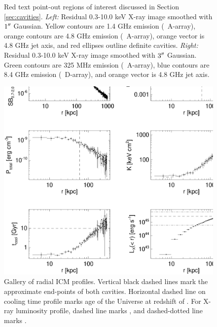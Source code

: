 \begin{figure}
\begin{center}
\begin{minipage}{0.495\linewidth}
    \end{minipage}
    \caption{Red text point-out regions of interest discussed in
      Section \ref{sec:cavities}. {\it{Left:}} Residual 0.3-10.0 keV
      X-ray image smoothed with $1\rm{^\prime}\hskip -0.1em\rm{^\prime}$ Gaussian. Yellow contours are
      1.4 GHz emission (\vla\ A-array), orange contours are 4.8 GHz
      emission (\vla\ A-array), orange vector is 4.8 GHz jet axis, and
      red ellipses outline definite cavities. {\it{Right:}} Residual
      0.3-10.0 keV X-ray image smoothed with $3\rm{^\prime}\hskip -0.1em\rm{^\prime}$ Gaussian. Green
      contours are 325 MHz emission (\vla\ A-array), blue contours are
      8.4 GHz emission (\vla\ D-array), and orange vector is 4.8 GHz
      jet axis.}
    \label{fig:subxray}
  \end{center}
\end{figure}

\begin{figure}
  \begin{center}
    \begin{minipage}{\linewidth}
      \includegraphics*[width=\textwidth]{r797_nhfro.eps}
      \caption{Gallery of radial ICM profiles. Vertical black dashed
        lines mark the approximate end-points of both
        cavities. Horizontal dashed line on cooling time profile marks
        age of the Universe at redshift of \rbs. For X-ray luminosity
        profile, dashed line marks \lcool, and dashed-dotted line
        marks \pcav.}
      \label{fig:gallery}
    \end{minipage}
  \end{center}
\end{figure}

